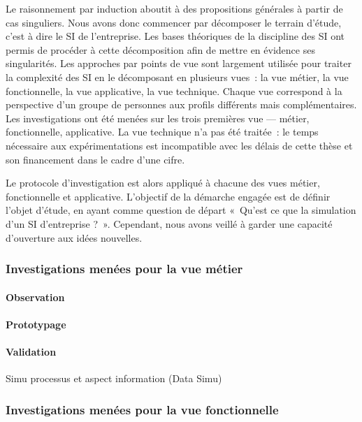 {\begin{enumerate}
		\end{enumerate}
		
	Le raisonnement par induction aboutit à des propositions générales à partir de 
cas singuliers. Nous avons donc commencer par décomposer le terrain d'étude, 
c'est à dire le SI de l'entreprise. Les bases théoriques de la discipline des SI 
ont permis de procéder à cette décomposition afin de mettre en évidence ses 
singularités. Les approches par points de vue sont largement utilisée pour 
traiter la complexité des SI en le décomposant en plusieurs vues~: la vue 
métier, la vue fonctionnelle, la vue applicative, la vue technique. Chaque vue 
correspond à la perspective d'un groupe de personnes aux profils différents mais 
complémentaires. Les investigations ont été menées sur les trois premières vue — 
métier, fonctionnelle, applicative. La vue technique n'a pas été traitée~: le 
temps nécessaire aux expérimentations est incompatible avec les délais de cette 
thèse et son financement dans le cadre d'une \gls{cifre}.
	
	Le protocole d'investigation est alors appliqué à chacune des vues métier, 
fonctionnelle et applicative. L'objectif de la démarche engagée est de définir 
l'objet d'étude, en ayant comme question de départ «~Qu'est ce que la simulation 
d'un SI d'entreprise ?~». Cependant, nous avons veillé à garder une capacité 
d'ouverture aux idées nouvelles.
	
	\subsubsection{Investigations menées pour la vue métier}
	
		\paragraph{Observation}
		
		\paragraph{Prototypage}
		
		\paragraph{Validation}
	Simu processus et aspect information (Data Simu)
	
	\subsubsection{Investigations menées pour la vue fonctionnelle} 
}
